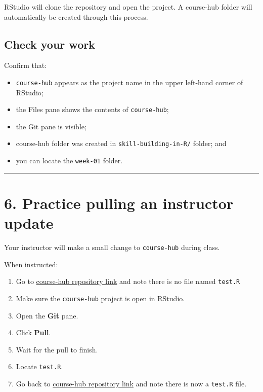 \documentclass[
  letterpaper,
  DIV=11,
  numbers=noendperiod]{scrartcl}
\providecommand{\tightlist}{%
  \setlength{\itemsep}{0pt}\setlength{\parskip}{0pt}}
\begin{document}
RStudio will clone the repository and open the project. A course-hub
folder will automatically be created through this process.

\subsection{Check your work}\label{check-your-work}

Confirm that:

\begin{itemize}
\tightlist
\item
  \texttt{course-hub} appears as the project name in the upper left-hand
  corner of RStudio;
\item
  the Files pane shows the contents of \texttt{course-hub};
\item
  the Git pane is visible;
\item
  course-hub folder was created in \texttt{skill-building-in-R/} folder;
  and
\item
  you can locate the \texttt{week-01} folder.
\end{itemize}

\begin{center}\rule{0.5\linewidth}{0.5pt}\end{center}

\section{6. Practice pulling an instructor
update}\label{practice-pulling-an-instructor-update}

Your instructor will make a small change to \texttt{course-hub} during
class.

When instructed:

\begin{enumerate}
\def\labelenumi{\arabic{enumi}.}
\tightlist
\item
  Go to
  \href{https://github.com/fall2026-skill-building-in-R/course-hub}{course-hub
  repository link} and note there is no file named \texttt{test.R}
\item
  Make sure the \texttt{course-hub} project is open in RStudio.
\item
  Open the \textbf{Git} pane.
\item
  Click \textbf{Pull}.
\item
  Wait for the pull to finish.
\item
  Locate \texttt{test.R}.
\item
  Go back to
  \href{https://github.com/fall2026-skill-building-in-R/course-hub}{course-hub
  repository link} and note there is now a \texttt{test.R} file.
\end{enumerate}
\end{document}
